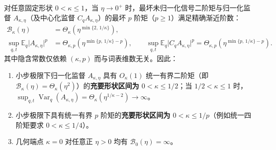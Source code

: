 \documentclass[lang=cn,scheme=chinese,openany]{elegantbook}
\newcommand{\E}{\mathbb E}
\newcommand{\Var}{\operatorname{Var}}
\begin{document}
\begin{theorem}
\label{thm:proximal-moment-threshold}
\label{thm:power-general-moment-threshold}
对任意固定形状 $0<\kappa\le 1$，当 $\eta\to 0^+$ 时，最坏未归一化信号二阶矩与归一化监督 $A_{\kappa,\eta}$（及中心化监督 $C_q A_{\kappa,\eta}$）的最坏 $p$ 阶矩（$p\ge 1$）满足精确渐近阶数：
\begin{align}
 \mathcal B_\kappa(\eta)&=\Theta_\kappa\!\left(\eta^{\min\{2,\,1/\kappa\}}\right),
 \label{eq:proximal-sharp-moment-order}\\
 \sup_{q,t}\E_q\bigl|A_{\kappa,\eta}\bigr|^p
 &=\Theta_{\kappa,p}\!\left(\eta^{\min\{p,\,1/\kappa\}-p}\right),
 \qquad
 \sup_{q,t}\E_q\bigl|C_q A_{\kappa,\eta}\bigr|^p
 =\Theta_{\kappa,p}\!\left(\eta^{\min\{p,\,1/\kappa\}-p}\right).
\end{align}
其中隐含常数仅依赖 $(\kappa,p)$ 而与词表维数无关。因此：
\begin{enumerate}
\item 小步极限下归一化监督 $A_{\kappa,\eta}$ 具有 $O_\kappa(1)$ 统一有界二阶矩（即 $\mathcal B_\kappa(\eta)=\Theta_\kappa(\eta^2)$）的\textbf{充要形状区间为 $0<\kappa\le 1/2$}；当 $1/2<\kappa\le 1$ 时，$\sup_{q,t}\Var_q(A_{\kappa,\eta})=\Theta_\kappa(\eta^{1/\kappa-2})\to\infty$。
\item 小步极限下具有统一有界 $p$ 阶矩的\textbf{充要形状区间为 $0<\kappa\le 1/p$}（例如统一四阶矩要求 $0<\kappa\le 1/4$）。
\item 几何端点 $\kappa=0$ 对任意正 $\eta>0$ 均有 $\mathcal B_0(\eta)=\infty$。
\end{enumerate}
\end{theorem}
\end{document}
